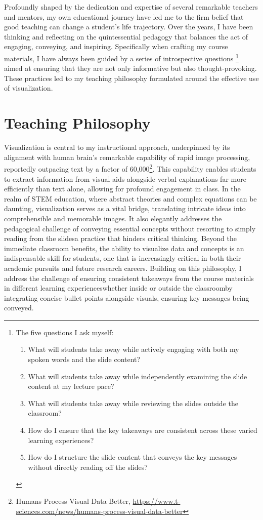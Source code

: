 Profoundly shaped by the dedication and expertise of several remarkable teachers and mentors, my own educational journey have led me to the firm belief that good teaching can change a student's life trajectory. Over the years, I have been thinking and reflecting on the quintessential pedagogy that balances the act of engaging, conveying, and inspiring. Specifically when crafting my course materials, I have always been guided by a series of introspective questions%
\footnote[][-1in]{%
    The five questions I ask myself:
    \begin{enumerate}
        \item What will students take away while actively engaging with both my spoken words and the slide content?
        \item What will students take away while independently examining the slide content at my lecture pace?
        \item What will students take away while reviewing the slides outside the classroom?
        \item How do I ensure that the key takeaways are consistent across these varied learning experiences?
        \item How do I structure the slide content that conveys the key messages without directly reading off the slides?
    \end{enumerate}
}
aimed at ensuring that they are not only informative but also thought-provoking. These practices led to my teaching philosophy formulated around the effective use of visualization.

\section{Teaching Philosophy}
Visualization is central to my instructional approach, underpinned by its alignment with human brain's remarkable capability of rapid image processing, reportedly outpacing text by a factor of 60,000\footnote{Humans Process Visual Data Better, \url{https://www.t-sciences.com/news/humans-process-visual-data-better}}.
This capability enables students to extract information from visual aids alongside verbal explanations far more efficiently than text alone, allowing for profound engagement in class. In the realm of STEM education, where abstract theories and complex equations can be daunting, visualization serves as a vital bridge, translating intricate ideas into comprehensible and memorable images. It also elegantly addresses the pedagogical challenge of conveying essential concepts without resorting to simply reading from the slides\textemdash a practice that hinders critical thinking. Beyond the immediate classroom benefits, the ability to visualize data and concepts is an indispensable skill for students, one that is increasingly critical in both their academic pursuits and future research careers. Building on this philosophy, I address the challenge of ensuring consistent takeaways from the course materials in different learning experiences\textemdash whether inside or outside the classroom\textemdash by integrating concise bullet points alongside visuals, ensuring key messages being conveyed.

